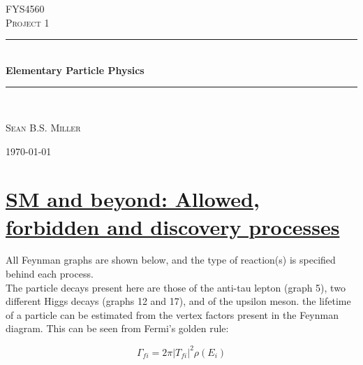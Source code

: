 \documentclass[11pt,a4paper]{article}
\newcommand{\HRule}{\rule{\linewidth}{0.5mm}}
\begin{document}
\begin{titlepage}
\begin{center}
\medskip
\textsc{\LARGE FYS4560}\\[1.5cm]

\textsc{\Large Project 1}\\[0.5cm]

\HRule \\[1.0cm]
{ \huge \bfseries Elementary Particle Physics \\[0.4cm] }
\HRule \huge \\[1.5cm]

\begin{minipage}{0.4\textwidth}
\begin{center}
\large\textsc{Sean B.S. Miller}\\

\end{center}
\end{minipage}

\vfill

{\large \today}

\end{center}
\end{titlepage}

\newpage

\fancyhead[C]{\textsc{\today}}
\fancyfoot[C]{\thepage}

\section{\underline{SM and beyond: Allowed, forbidden and discovery processes}}
All Feynman graphs are shown below, and the type of reaction(s) is specified behind each process.\\
The particle decays present here are those of the anti-tau lepton (graph 5), two different Higgs decays (graphs 12 and 17), and of the upsilon meson. the lifetime of a particle can be estimated from the vertex factors present in the Feynman diagram. This can be seen from Fermi's golden rule:

\begin{equation}
	\Gamma_{fi} = 2\pi|T_{fi}|^2\rho(E_i)
\end{equation}
\end{document}
